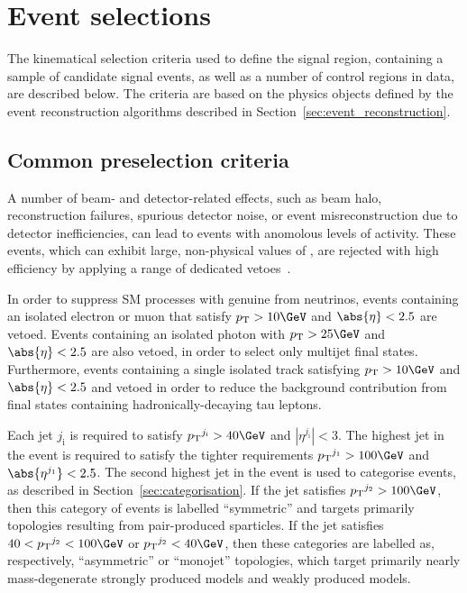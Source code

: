 \section{Event selections}
\label{sec:event_selection}

The kinematical selection criteria used to define the signal region,
containing a sample of candidate signal events, as well as a number of
control regions in data, are described below. The criteria are based
on the physics objects defined by the event reconstruction algorithms
described in Section~\ref{sec:event_reconstruction}.

\subsection{Common preselection criteria}
\label{sec:preselection}

A number of beam- and detector-related effects, such as beam halo,
reconstruction failures, spurious detector noise, or event
misreconstruction due to detector inefficiencies, can lead to events
with anomolous levels of activity. These events, which can exhibit
large, non-physical values of \ETmiss, are rejected with high
efficiency by applying a range of dedicated
vetoes~\cite{1748-0221-5-03-T03014, CMS-NOTE-2010-012, cms-met}.

In order to suppress SM processes with genuine \ETmiss from neutrinos,
events containing an isolated electron or muon that satisfy $\Pt >
10\GeV$ and $\abs{\eta} < 2.5$ are vetoed. Events containing an
isolated photon with $\Pt > 25\GeV$ and $\abs{\eta} < 2.5$ are also
vetoed, in order to select only multijet final states. Furthermore,
events containing a single isolated track satisfying $\Pt > 10\GeV$
and $\abs{\eta} < 2.5$ and vetoed in order to reduce the background
contribution from final states containing hadronically-decaying tau
leptons.

Each jet $j_\text{i}$ is required to satisfy $\Pt^{j_\text{i}} >
40\GeV$ and $|\eta^{j_\text{i}}| < 3$. The highest \Pt jet in the
event is required to satisfy the tighter requirements
$\Pt^{j_\text{1}} > 100\GeV$ and $\abs{\eta^{j_\text{1}}} < 2.5$. The
second highest \Pt jet in the event is used to categorise events, as
described in Section~\ref{sec:categorisation}. If the jet satisfies
$\Pt^{j_\text{2}} > 100\GeV$, then this category of events is labelled
``symmetric'' and targets primarily topologies resulting from
pair-produced sparticles. If the jet satisfies $40 < \Pt^{j_\text{2}}
< 100\GeV$ or $\Pt^{j_\text{2}} < 40\GeV$, then these categories are
labelled as, respectively, ``asymmetric'' or ``monojet'' topologies,
which target primarily nearly mass-degenerate strongly produced models
and weakly produced models.

